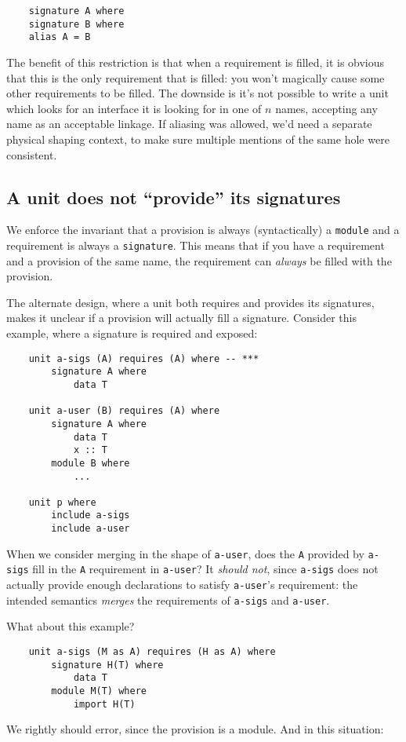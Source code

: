 \documentclass{article}
\begin{document}
\begin{verbatim}
    signature A where
    signature B where
    alias A = B
\end{verbatim}
%
The benefit of this restriction is that when a requirement is filled,
it is obvious that this is the only requirement that is filled: you won't
magically cause some other requirements to be filled.  The downside is
it's not possible to write a unit which looks for an interface it is
looking for in one of $n$ names, accepting any name as an acceptable linkage.
If aliasing was allowed, we'd need a separate physical shaping context,
to make sure multiple mentions of the same hole were consistent.

\subsection{A unit does not ``provide'' its signatures}
We enforce the invariant that
a provision is always (syntactically) a \verb|module| and a requirement
is always a \verb|signature|.  This means that if you have a requirement
and a provision of the same name, the requirement can \emph{always} be filled
with the provision.

The alternate design, where a unit both requires and provides
its signatures, makes it unclear if a provision
will actually fill a signature.  Consider this example, where
a signature is required and exposed:

\begin{verbatim}
    unit a-sigs (A) requires (A) where -- ***
        signature A where
            data T

    unit a-user (B) requires (A) where
        signature A where
            data T
            x :: T
        module B where
            ...

    unit p where
        include a-sigs
        include a-user
\end{verbatim}
%
When we consider merging in the shape of \verb|a-user|, does the
\verb|A| provided by \verb|a-sigs| fill in the \verb|A| requirement
in \verb|a-user|?  It \emph{should not}, since \verb|a-sigs| does not
actually provide enough declarations to satisfy \verb|a-user|'s
requirement: the intended semantics \emph{merges} the requirements
of \verb|a-sigs| and \verb|a-user|.

What about this example?

\begin{verbatim}
    unit a-sigs (M as A) requires (H as A) where
        signature H(T) where
            data T
        module M(T) where
            import H(T)
\end{verbatim}
%
We rightly should error, since the provision is a module. And in this situation:
\end{document}
